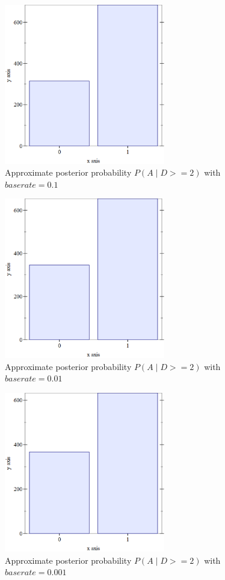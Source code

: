 \begin{figure}[ht!]
  \centering
  \includegraphics[width=7cm]{images/6.1.png}
  \caption{
    Approximate posterior probability $ P(A\;|\;D >= 2) $ with $baserate = 0.1 $
  }
  \label{fig:baserate-1}
\end{figure}
\begin{figure}[ht!]
  \centering
  \includegraphics[width=7cm]{images/6.2.png}
  \caption{
    Approximate posterior probability $ P(A\;|\;D >= 2) $ with $baserate = 0.01 $
  }
  \label{fig:baserate-01}
\end{figure}
\begin{figure}[ht!]
  \centering
  \includegraphics[width=7cm]{images/6.3.png}
  \caption{
    Approximate posterior probability $ P(A\;|\;D >= 2) $ with $baserate = 0.001 $
  }
  \label{fig:baserate-001}
\end{figure}